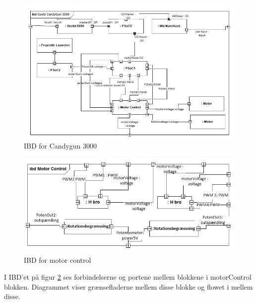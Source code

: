 \begin{figure}[H]
	\centering
	\includegraphics[width=\textwidth]{Systemarkitektur/images/GoofyCandyIBDImageRev2}
	\caption{IBD for Candygun 3000}
	\label{fig:IBD}
\end{figure}

\begin{figure}[H]
	\centering
	\includegraphics[width= \textwidth]{Systemarkitektur/images/IBDmotorcontrol2}
	\caption{IBD for motor control}
	\label{fig:IBDm}
\end{figure}
I IBD'et på figur \ref{fig:IBDm} ses forbindelserne og portene mellem blokkene i motorControl blokken. Diagrammet viser grænsefladerne mellem disse blokke og flowet i mellem disse.


